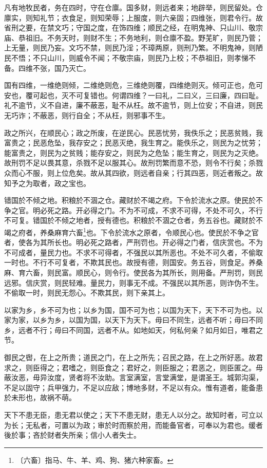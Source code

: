 \documentclass[12pt,UTF-8,openany,a4]{ctexbook}
\begin{document}
\begin{large}
    
    凡有地牧民者，务在四时，守在仓廪。国多财，则远者来；地辟举，则民留处。仓廪实，则知礼节；衣食足，则知荣辱；上服度，则六亲固；四维张，则君令行。故省刑之要，在禁文巧；守国之度，在饰四维；顺民之经，在明鬼神、只山川、敬宗庙、恭祖旧。不务天时，则财不生；不务地利，则仓廪不盈。野芜旷，则民乃菅；上无量，则民乃妄。文巧不禁，则民乃淫；不璋两原，则刑乃繁。不明鬼神，则陋民不悟；不只山川，则威令不闻；不敬宗庙，则民乃上校；不恭祖旧，则孝悌不备。四维不张，国乃灭亡。
    
    国有四维，一维绝则倾，二维绝则危，三维绝则覆，四维绝则灭。倾可正也，危可安也，覆可起也，灭不可复错也。何谓四维？一曰礼，二曰义，三曰廉，四曰耻。礼不逾节，义不自进，廉不蔽恶，耻不从枉。故不逾节，则上位安；不自进，则民无巧诈；不蔽恶，则行自全；不从枉，则邪事不生。
    
    政之所兴，在顺民心；政之所废，在逆民心。民恶忧劳，我佚乐之；民恶贫贱，我富贵之；民恶危坠，我存安之；民恶灭绝，我生育之。能佚乐之，则民为之忧劳；能富贵之，则民为之贫贱；能存安之，则民为之危坠；能生育之，则民为之灭绝。故刑罚不足以畏其意，杀戮不足以服其心。故刑罚繁而意不恐，则令不行矣；杀戮众而心不服，则上位危矣。故从其四欲，则远者自亲；行其四恶，则近者叛之。故知予之为取者，政之宝也。
    
    错国於不倾之地。积粮於不涸之仓。藏财於不竭之府。下令於流水之原。使民於不争之官。明必死之路。开必得之门。不为不可成，不求不可得，不处不可久，不行不可复。错国於不倾之地者，授有德也。积粮於不涸之仓者，务五谷也。藏财於不竭之府者，养桑麻育六畜\footnote{〔六畜〕\yiwen 指马、牛、羊、鸡、狗、猪六种家畜。}也。下令於流水之原者，令顺民心也。使民於不争之官者，使各为其所长也。明必死之路者，严刑罚也。开必得之门者，信庆赏也。不为不可成者，量民力也。不求不可得者，不强民以其所恶也。不处不可久者，不偷取一时也。不行不可复者，不欺其民也。故授有德，则国安。务五谷，则食足。养桑麻、育六畜，则民富。顺民心，则令行。使民各为其所长，则用备。严刑罚，则民远邪。信庆赏，则民轻难。量民力，则事无不成。不强民以其所恶，则诈伪不生。不偷取一时，则民无怨心。不欺其民，则下亲其上。
    
    以家为乡，乡不可为也；以乡为国，国不可为也；以国为天下，天下不可为也。以家为家，以乡为乡，以国为国，以天下为天下。毋曰不同生，远者不听；毋曰不同乡，远者不行；毋曰不同国，远者不从。如地如天，何私何亲？如月如日，唯君之节。
    
    御民之辔，在上之所贵；道民之门，在上之所先；召民之路，在上之所好恶。故君求之，则臣得之；君嗜之，则臣食之；君好之，则臣服之；君恶之，则臣匿之。毋蔽汝恶，毋异汝度，贤者将不汝助。言室满室，言堂满堂，是谓圣王。城郭沟渠，不足以固守；兵甲强力，不足以应敌；博地多财，不足以有众。惟有道者，能备患於未形也，故祸不萌。
    
    天下不患无臣，患无君以使之；天下不患无财，患无人以分之。故知时者，可立以为长；无私者，可置以为政；审於时而察於用，而能备官者，可奉以为君也。缓者後於事；吝於财者失所亲；信小人者失士。
\end{large}
\end{document}
